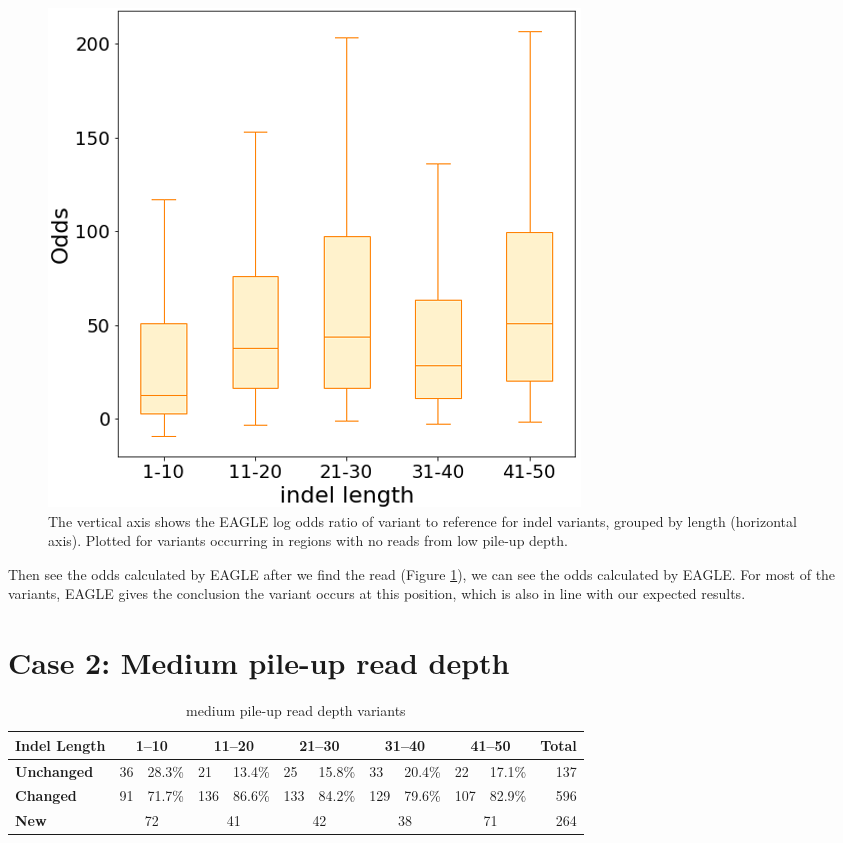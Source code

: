 \begin{figure}[H]
\centering
\includegraphics[width=0.6\columnwidth]{body/image/low_new_odds.png}
\caption[no reads with variants from low pile-up depth odds ratio]{The vertical axis shows the EAGLE log odds ratio of variant to reference for indel variants, grouped by length (horizontal axis).  Plotted for variants occurring in regions with no reads from low pile-up depth.}
\label{low_new_odds}
\end{figure}

Then see the odds calculated by EAGLE after we find the read (Figure \ref{low_new_odds}), we can see the odds calculated by EAGLE. For most of the variants, EAGLE gives the conclusion the variant occurs at this position, which is also in line with our expected results.


\section{Case 2: Medium pile-up read depth}
\begin{center}
\begin{table}[h]
    \centering
    \caption[medium pile-up read depth variants]{medium pile-up read depth variants}
    \vspace{-0.5cm}
    \begin{tabular}{|l|l|l|l|l|l|l|l|l|l|l|r|}
    \hline
    \textbf{Indel Length} & 
    \multicolumn{2}{c|}{\textbf{1--10}}  & \multicolumn{2}{c|}{\textbf{11--20}}  & \multicolumn{2}{c|}{\textbf{21--30}}  &
    \multicolumn{2}{c|}{\textbf{31--40}}  & \multicolumn{2}{c|}{\textbf{41--50}}   & 
    \textbf{Total}\\\hline
    \rowcolor{lightgray}
    \textbf{Unchanged}  & 
    36 & 28.3\%       &
    21 & 13.4\%     &
    25 & 15.8\%    &
    33 & 20.4\%     &
    22 & 17.1\%          &
    137\\ \hline
    \textbf{Changed} & 
    91 & 71.7\%       &
    136 & 86.6\%     & 
    133 & 84.2\%    & 
    129 & 79.6\%     &
    107 & 82.9\%        &
    596\\ \hline
    \rowcolor{lightgray}    
    \textbf{New}  & 
    \multicolumn{2}{c|}{72}      &
    \multicolumn{2}{c|}{41}     &
    \multicolumn{2}{c|}{42}      &
    \multicolumn{2}{c|}{38}    &
    \multicolumn{2}{c|}{71}       & 
    264\\ \hline
    \end{tabular}
    \label{tab:mid-variants}
\end{table}
\end{center}

